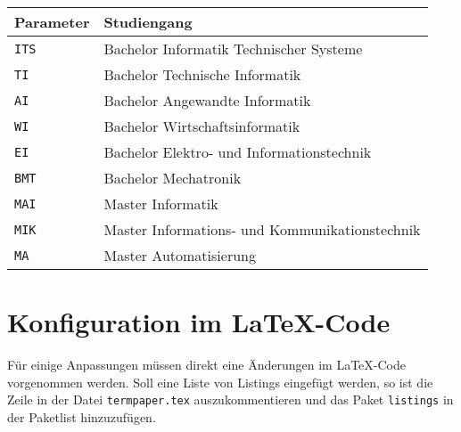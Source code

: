 \begin{center}
  \begin {tabular}{ll}
    Parameter & Studiengang \\
    \hline
    \texttt{ITS} & Bachelor Informatik Technischer Systeme \\
    \texttt{TI} & Bachelor Technische Informatik \\
    \texttt{AI} & Bachelor Angewandte Informatik \\
    \texttt{WI} & Bachelor Wirtschaftsinformatik \\
    \texttt{EI} & Bachelor Elektro- und Informationstechnik \\
    \texttt{BMT} & Bachelor Mechatronik \\
    \texttt{MAI} & Master Informatik \\
    \texttt{MIK} & Master Informations- und Kommunikationstechnik \\
    \texttt{MA} & Master Automatisierung \\
  \end{tabular}
\end{center}

\section{Konfiguration im \LaTeX -Code}\label{sec:codechanges}
Für einige Anpassungen müssen direkt eine Änderungen im \LaTeX -Code vorgenommen werden. Soll eine Liste von Listings eingefügt werden, so ist die Zeile in der Datei \texttt{termpaper.tex} auszukommentieren und das Paket \texttt{listings} in der Paketlist hinzuzufügen.
